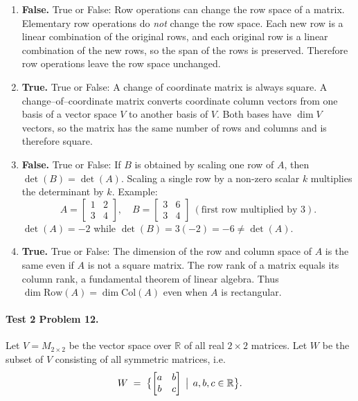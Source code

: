\documentclass{article}
\begin{document}
\begin{multicols*}{2}
\begin{enumerate}[label=(\alph*)]

\item \textbf{False.}  True or False: Row operations can change the row space of a matrix.
Elementary row operations do \emph{not} change the row space.  
Each new row is a linear combination of the original rows, and each original row is a linear combination of the new rows, so the span of the rows is preserved.  
Therefore row operations leave the row space unchanged.

\item \textbf{True.}  
True or False: A change of coordinate matrix is always square. A change–of–coordinate matrix converts coordinate column vectors from one basis of a vector space $V$ to another basis of $V$.  
Both bases have $\dim V$ vectors, so the matrix has the same number of rows and columns and is therefore square.

\item \textbf{False.}  True or False: If $B$ is obtained by scaling one row of $A$, then $\det(B)=\det(A)$.
Scaling a single row by a non-zero scalar $k$ multiplies the determinant by $k$.  
Example:  
$$
A=\begin{bmatrix}1&2\\3&4\end{bmatrix},\quad
B=\begin{bmatrix}3&6\\3&4\end{bmatrix}\ (\text{first row multiplied by }3).
$$
$\det(A) = -2$ while $\det(B) = 3(-2) = -6 \ne \det(A)$.

\item \textbf{True.}  True or False: The dimension of the row and column space of $A$ is the same even if $A$ is not a square matrix.
The row rank of a matrix equals its column rank, a fundamental theorem of linear algebra.  
Thus $\dim\text{Row}(A)=\dim\text{Col}(A)$ even when $A$ is rectangular.
\end{enumerate}

\paragraph{Test 2 Problem 12.}
Let $V = M_{2\times 2}$ be the vector space over $\mathbb{R}$ of all real $2\times 2$ matrices.  
Let $W$ be the subset of $V$ consisting of all symmetric matrices, i.e.
$$
W \;=\;\bigl\{\begin{bmatrix} a & b \\ b & c \end{bmatrix}\,\bigm|\,a,b,c\in\mathbb{R}\bigr\}.
$$


\end{multicols*}
\end{document}
